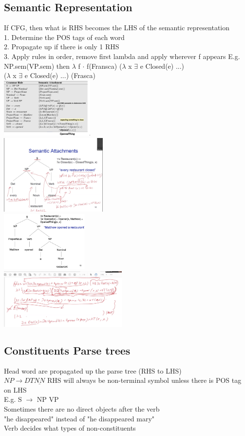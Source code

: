 \documentclass[11pt]{article}
\begin{document}
\begin{multicols*}{3}
{\subsection*{Semantic Representation}
If CFG, then what is RHS becomes the LHS of the semantic representation\\
1. Determine the POS tags of each word\\
2. Propagate up if there is only 1 RHS\\
3. Apply rules in order, remove first lambda and apply wherever f appears
E.g.\\
NP.sem(VP.sem) then $\lambda$ f $\cdot$ f(Fransca) ($\lambda$ x $\exists$ e Closed(e) ...)
\\
($\lambda$ x $\exists$ e Closed(e) ...) (Frasca)
\\
\includegraphics[height=3cm]{images/w14}\\
\includegraphics[height=4cm]{images/w12}\\
\includegraphics[height=3cm]{images/w15}\\
\includegraphics[height=3cm]{images/w13}\\
\subsection*{Constituents Parse trees}
Head word are propagated up the parse tree (RHS to LHS)\\
$NP \rightarrow DT \underline{NN}$
RHS will always be non-terminal symbol unless there is POS tag on LHS\\
E.g. S $\rightarrow$ NP VP
\\
Sometimes there are no direct objects after the verb\\
"he disappeared" instead of "he disappeared mary"\\
Verb decides what types of non-constituents
}
\end{multicols*}
\end{document}
